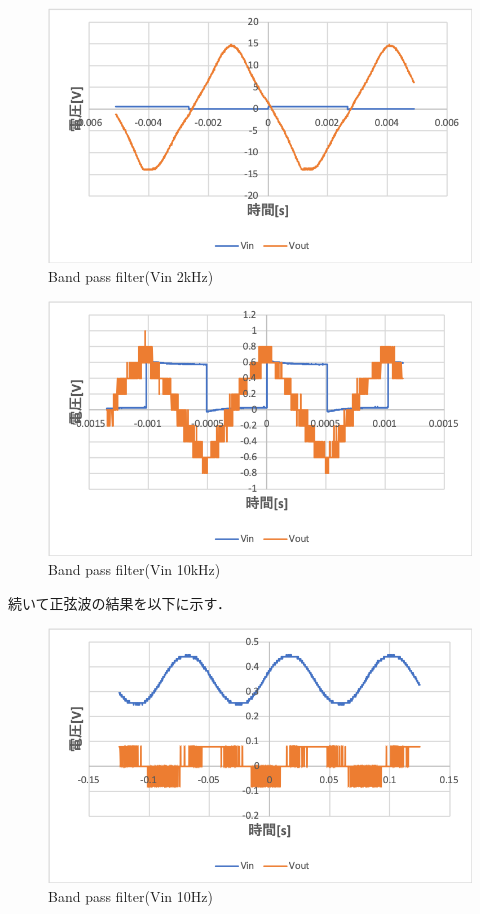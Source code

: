 \documentclass[11pt, a4paper,twocolumn]{jarticle}
\begin{document}
\begin{figure}[htbp]
 \begin{center}
  \includegraphics[width=0.8\linewidth]{fig49.png}
 \end{center}
 \caption{Band pass filter(Vin 2kHz)}
 \label{fig:49}
\end{figure}

\begin{figure}[htbp]
 \begin{center}
  \includegraphics[width=0.8\linewidth]{fig50.png}
 \end{center}
 \caption{Band pass filter(Vin 10kHz)}
 \label{fig:50}
\end{figure}

\newpage

続いて正弦波の結果を以下に示す．

\begin{figure}[htbp]
 \begin{center}
  \includegraphics[width=0.8\linewidth]{fig51.png}
 \end{center}
 \caption{Band pass filter(Vin 10Hz)}
 \label{fig:51}
\end{figure}
\end{document}
